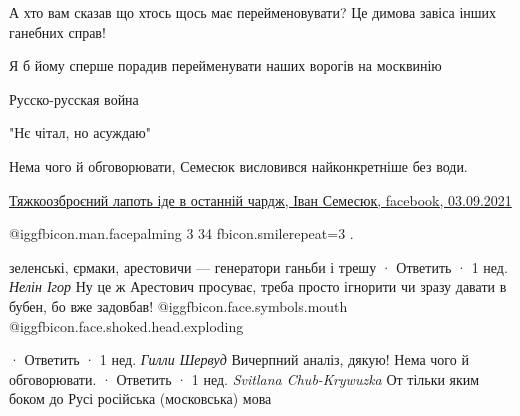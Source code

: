 \begin{itemize}
А хто вам сказав що хтось щось має перейменовувати? Це димова завіса інших ганебних справ!

 
Я б йому сперше порадив перейменувати наших ворогів на москвинію

 
Русско-русская война

 
"Нє чітал, но асуждаю"

 

Нема чого й обговорювати, Семесюк висловився найконкретніше без води.

\href{https://www.facebook.com/ivan.semesyuk/posts/4649164168467447}{%
Тяжкоозброєний лапоть іде в останній чардж, Іван Семесюк, facebook, 03.09.2021%
}


@igg{fbicon.man.facepalming 3 34 fbicon.smile}{repeat=3} .
 
зеленські, єрмаки, арестовичи — генератори ганьби і трешу
 · Ответить · 1 нед.
\emph{Нелін Ігор}
Ну це ж Арестович просуває, треба просто ігнорити чи зразу давати в бубен, бо вже задовбав!  @igg{fbicon.face.symbols.mouth}  @igg{fbicon.face.shoked.head.exploding} 

 · Ответить · 1 нед.
\emph{Гилли Шервуд}
Вичерпний аналіз, дякую!
Нема чого й обговорювати.
 · Ответить · 1 нед.
\emph{Svitlana Chub-Krywuzka}
От тільки яким боком до Русі російська (московська) мова



\end{itemize}
